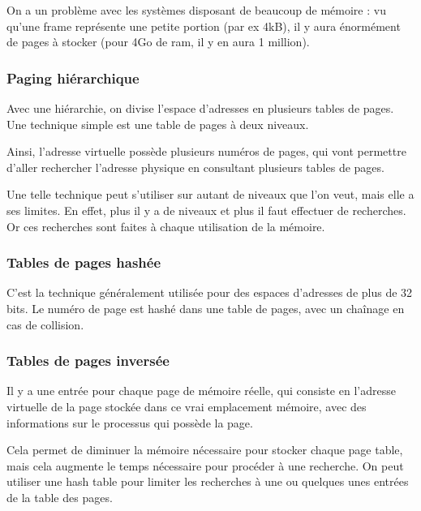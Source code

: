 	On a un problème avec les systèmes disposant de beaucoup de mémoire : vu qu'une frame représente une petite portion (par ex 4kB), il y aura énormément de pages à stocker (pour 4Go de ram, il y en aura 1 million).
	
	\subsubsection{Paging hiérarchique}
	
	Avec une hiérarchie, on divise l'espace d'adresses en plusieurs tables de pages. Une technique simple est une table de pages à deux niveaux.
	
	
	Ainsi, l'adresse virtuelle possède plusieurs numéros de pages, qui vont permettre d'aller rechercher l'adresse physique en consultant plusieurs tables de pages.
	
	
	Une telle technique peut s'utiliser sur autant de niveaux que l'on veut, mais elle a ses limites. En effet, plus il y a de niveaux et plus il faut effectuer de recherches. Or ces recherches sont faites à chaque utilisation de la mémoire.
	
	\subsubsection{Tables de pages hashée}
	
	C'est la technique généralement utilisée pour des espaces d'adresses de plus de 32 bits. Le numéro de page est hashé dans une table de pages, avec un chaînage en cas de collision.
	
	
	\subsubsection{Tables de pages inversée}
	
	Il y a une entrée pour chaque page de mémoire réelle, qui consiste en l'adresse virtuelle de la page stockée dans ce vrai emplacement mémoire, avec des informations sur le processus qui possède la page.
	
	Cela permet de diminuer la mémoire nécessaire pour stocker chaque page table, mais cela augmente le temps nécessaire pour procéder à une recherche. On peut utiliser une hash table pour limiter les recherches à une ou quelques unes entrées de la table des pages.
	
